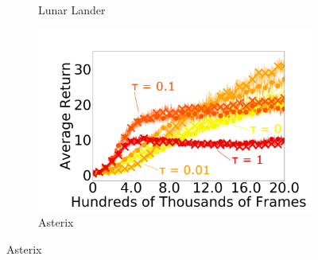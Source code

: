 \documentclass[twoside,11pt]{article}
\begin{document}
\begin{figure}[t]
\begin{subfigure}[b]{0.25\linewidth}
    \caption{Lunar Lander}
    \label{fig:lunar-lander}
  \end{subfigure}%
  \begin{subfigure}[b]{0.25\linewidth}
    \centering
    \includegraphics[width=\columnwidth]{figs/deep/discrete/labeled_asterix.png} 
    \caption{Asterix
    }\label{fig:asterix}
  \end{subfigure}%
  

\end{figure}
\end{document}
